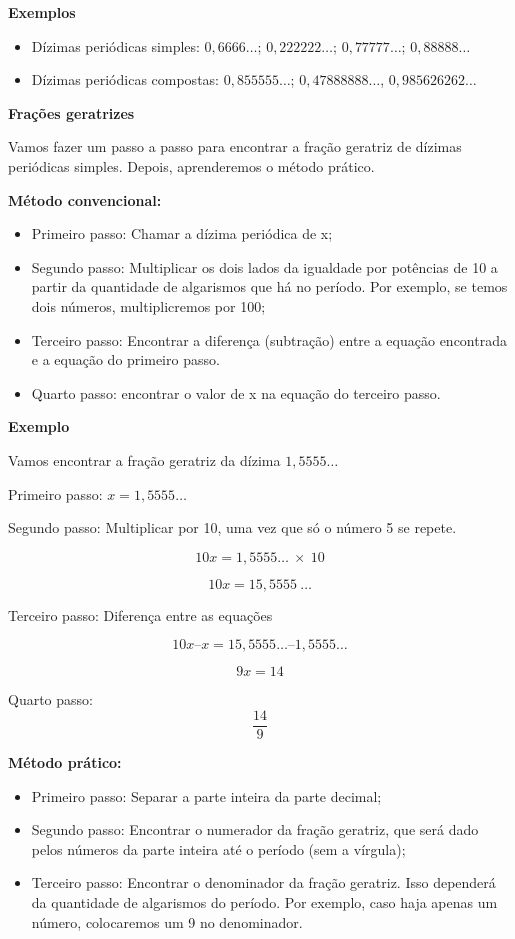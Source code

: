 \textbf{Exemplos}

\begin{itemize}

\item
  Dízimas periódicas simples: $0,6666\ldots$; $0,222222\ldots$;
  $0,77777\ldots$; $0,88888\ldots{}$

\item
  Dízimas periódicas compostas: $0,855555\ldots$; $0,47888888\ldots$,
  $0,985626262\ldots{}$

\end{itemize}

\textbf{Frações geratrizes}

Vamos fazer um passo a passo para encontrar a fração geratriz de dízimas
periódicas simples. Depois, aprenderemos o método prático.

\textbf{Método convencional:}

\begin{itemize}
\item
  Primeiro passo: Chamar a dízima periódica de x;
\item
  Segundo passo: Multiplicar os dois lados da igualdade por potências de
  10 a partir da quantidade de algarismos que há no período. Por
  exemplo, se temos dois números, multiplicremos por 100;
\item
  Terceiro passo: Encontrar a diferença (subtração) entre a equação
  encontrada e a equação do primeiro passo.
\item
  Quarto passo: encontrar o valor de x na equação do terceiro passo.
\end{itemize}

\textbf{Exemplo}

Vamos encontrar a fração geratriz da dízima $1,5555\ldots{}$

Primeiro passo: $x  = 1,5555\ldots$

Segundo passo: Multiplicar por 10, uma vez que só o número 5 se repete.

$$10x  =  1,5555\ldots\  \times \ 10$$ 

$$10x =  15,5555\ \ldots$$

Terceiro passo: Diferença entre as equações

$$10 x – x  =  15,5555 \ldots – 1,5555\ldots$$

$$9x  =  14$$

Quarto passo: $$\frac{14}{9}$$

\textbf{Método prático:}

\begin{itemize}
\item
  Primeiro passo: Separar a parte inteira da parte decimal;
\item
  Segundo passo: Encontrar o numerador da fração geratriz, que será dado
  pelos números da parte inteira até o período (sem a vírgula);
\item
  Terceiro passo: Encontrar o denominador da fração geratriz. Isso
  dependerá da quantidade de algarismos do período. Por exemplo, caso
  haja apenas um número, colocaremos um 9 no denominador.
\end{itemize}

